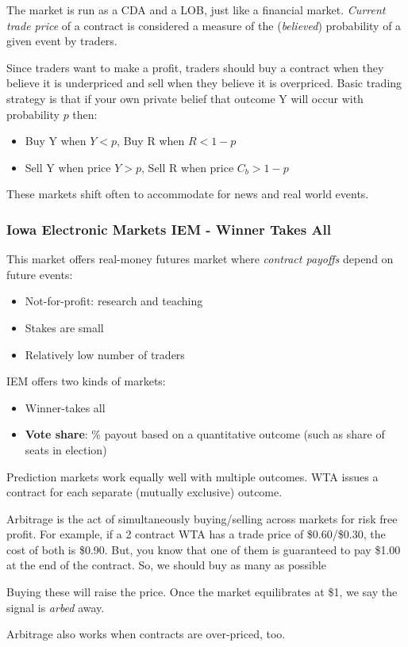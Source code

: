 \documentclass[11pt,a4paper,titlepage,dvipsnames,cmyk]{scrartcl}
\begin{document}
The market is run as a CDA and a LOB, just like a financial market. \textit{Current trade price} of a contract is considered a measure of the (\textit{believed}) probability of a given event by traders.

Since traders want to make a profit, traders should buy a contract when they believe it is underpriced and sell when they believe it is overpriced. Basic trading strategy is that if your own private belief that outcome Y will occur with probability $p$ then:
\begin{itemize}
    \item Buy Y when $Y < p$, Buy R when $R < 1-p$
    \item Sell Y when price $Y > p$, Sell R when price $C_b > 1-p$
\end{itemize}

These markets shift often to accommodate for news and real world events.

\subsubsection{Iowa Electronic Markets IEM - Winner Takes All}
This market offers real-money futures market where \textit{contract payoffs} depend on future events:
\begin{itemize}
    \item Not-for-profit: research and teaching
    \item Stakes are small
    \item Relatively low number of traders
\end{itemize}

IEM offers two kinds of markets:
\begin{itemize}
    \item Winner-takes all
    \item \textbf{Vote share}: \% payout based on a quantitative outcome (such as share of seats in election)
\end{itemize}

Prediction markets work equally well with multiple outcomes. WTA issues a contract for each separate (mutually exclusive) outcome.

\begin{tcolorbox} [space to upper,
collower=white,
title={Arbitrage Opportunity},
nobeforeafter,
halign lower=flush right, ]
Arbitrage is the act of simultaneously buying/selling across markets for risk free profit. For example, if a 2 contract WTA has a trade price of \$0.60/\$0.30, the cost of both is \$0.90. But, you know that one of them is guaranteed to pay \$1.00 at the end of the contract. So, we should buy as many as possible

Buying these will raise the price. Once the market equilibrates at \$1, we say the signal is \textit{arbed} away.

Arbitrage also works when contracts are over-priced, too.
\end{tcolorbox}
\end{document}
